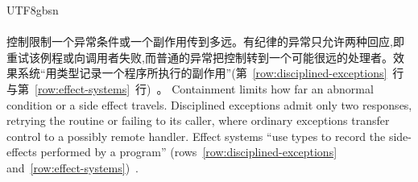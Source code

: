 \begin{CJK*}{UTF8}{gbsn}
\paragraph{}
\ifPaperChinese
控制限制一个异常条件或一个副作用传到多远。有纪律的异常只允许两种回应,即重试该例程或向调用者失败,而普通的异常把控制转到一个可能很远的处理者。效果系统``用类型记录一个程序所执行的副作用''(第~\ref{row:disciplined-exceptions}~行与第~\ref{row:effect-systems}~行)~\cite[第~46、417、427~页]{meyer1997-object-oriented-software-construction}\cite[\S~7.1]{peytonjones1993-imperative-functional-programming}。
\else
Containment limits how far an abnormal condition or a side effect travels.
Disciplined exceptions admit only two responses, retrying the routine or failing to its caller, where
ordinary exceptions transfer control to a possibly remote handler.
Effect systems ``use types to record the side-effects performed by a program''
(rows~\ref{row:disciplined-exceptions} and~\ref{row:effect-systems})~\cite[pp.~46, 417, 427]{meyer1997-object-oriented-software-construction}\cite[\S~7.1]{peytonjones1993-imperative-functional-programming}.
\fi


\end{CJK*}
